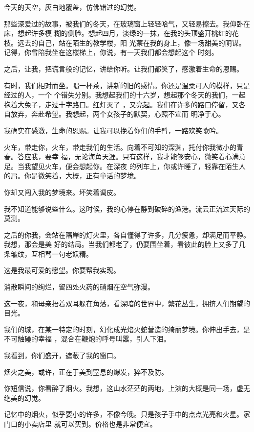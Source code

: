 \documentclass[12pt,a4paper]{article}
\begin{document}
		今天的天空，灰白地覆盖，仿佛错过的幻觉。

		那些深爱过的故事，被我们的冬天，在玻璃窗上轻轻哈气，又轻易擦去。我仰卧在床，想起许多模
	糊的侧脸。想起四月，淡绿的一抹，在我的头顶盛开桃红的花枝。远去的自己，站在陌生的教学楼，阳
	光蒙在我的身上，像一场甜美的阴谋。记得，你曾陪我坐在这楼梯上，你说，有一天我们都会想起这个
	时刻。


		之后，让我，把谎言般的记忆，讲给你听。让我们都笑了，感激着生命的恩赐。

		有时，我们相对而坐。喝一杯茶，讲新的旧的感情。你还是温柔可人的模样，只是经过的人，一个
	个错失分别。我想起我们的十六岁，想起那个冬天的我们，一起抱着大兔子，走过十字路口。红灯灭了
	，又亮起。我们在许多的路口停留，又各自放弃，奔赴希望。我想起，两个女孩子的默契，心照不宣而
	明净于心。

		我确实在感激，生命的恩赐。让我可以挽着你们的手臂，一路欢笑歌吟。

		火车，带走你，火车，带走我们的生活。向着不可知的深渊，托付你我微小的青春。答应我，要幸
	福，无论海角天涯。只有这样，我才能够安心，微笑着心满意足。当我望见火车，便会想起你。在深夜
	的列车上，你或许睡了，轻靠在陌生人的肩。你是微笑着，大概，正有童话的梦境。

		你却又闯入我的梦境来。坏笑着调皮。

		我不知道能够说些什么。这时候，我的心停在静到破碎的渔港。流云正流过天际的莫测。

		之后的你我，会站在隔岸的灯火里，各自懂得了许多，几分疲惫，却满足而平静。我想，那会是美
	好的结局。当我们都老了，仍要围坐着，看彼此的脸上又多了几条皱纹，互相骂一句老妖精。

		这是我最可爱的愿望。你要帮我实现。

	\endwriting



		消散瞬间的绚烂，留四处火药的硝烟在空气弥漫。

		这一夜，和母亲捂着双耳躲在角落，看深暗的世界中，繁花丛生，拥挤人们期望的目光。

		我们的城，在某一特定的时刻，幻化成光焰火蛇营造的绮丽梦境。你伸出手去，是不可触碰的幸福
	，混合在鞭炮的呼号叫嚣，引人下泪。

		我看到，你们盛开，遮蔽了我的窗口。\par
		烟火之美，或许，正在于美到窒息的爆发，猝不及防。\par
		你短信说，你看醉了烟火。我想，这山水茫茫的两地，上演的大概是同一场，虚无绝美的幻觉。

		记忆中的烟火，似乎要小的许多，不像今晚。只是孩子手中的点点光亮和火星。家门口的小卖店里
	就可以买到。价格也是非常便宜。
\end{document}
